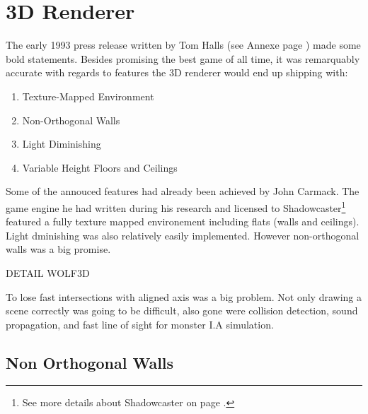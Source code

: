 \pagebreak
\section{3D Renderer}
The early 1993 press release written by Tom Halls (see Annexe page \pageref{label_press_release}) made some bold statements. Besides promising the best game of all time, it was remarquably accurate with regards to features the 3D renderer would end up shipping with:\\
\par
\begin{enumerate}
\item Texture-Mapped Environment
\item Non-Orthogonal Walls
\item Light Diminishing
\item Variable Height Floors and Ceilings
\end{enumerate}
\par
Some of the annouced features had already been achieved by John Carmack. The game engine he had written during his research and licensed to Shadowcaster\footnote{See more details about Shadowcaster on page \pageref{label_shadowcaster}.} featured a fully texture mapped environement including flats (walls and ceilings). Light dminishing was also relatively easily implemented. However non-orthogonal walls was a big promise.\\
\par
DETAIL WOLF3D\\
\par
To lose fast intersections with aligned axis was a big problem. Not only drawing a scene correctly was going to be difficult, also gone were collision detection, sound propagation, and fast line of sight for monster I.A simulation.\\
\par
{}



\subsection{Non Orthogonal Walls}

